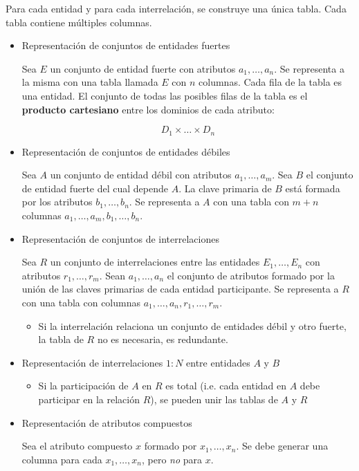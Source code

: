 \documentclass[a4paper, twoside]{article}
\begin{document}
Para cada entidad y para cada interrelación, se construye una única
tabla. Cada tabla contiene múltiples columnas.
\begin{itemize}
\item Representación de conjuntos de entidades fuertes


Sea $E$ un conjunto de entidad fuerte con atributos $a_{1},\ldots,a_{n}$.
Se representa a la misma con una tabla llamada $E$ con $n$ columnas.
Cada fila de la tabla es una entidad. El conjunto de todas las posibles
filas de la tabla es el \textbf{producto cartesiano }entre los dominios
de cada atributo:


\[
D_{1}\times\ldots\times D_{n}
\]


\item Representación de conjuntos de entidades débiles


Sea $A$ un conjunto de entidad débil con atributos $a_{1},\ldots,a_{m}$.
Sea $B$ el conjunto de entidad fuerte del cual depende $A$. La clave
primaria de $B$ está formada por los atributos $b_{1},\ldots,b_{n}$.
Se representa a $A$ con una tabla con $m+n$ columnas $a_{1},\ldots,a_{m},b_{1},\ldots,b_{n}$.

\item Representación de conjuntos de interrelaciones


Sea $R$ un conjunto de interrelaciones entre las entidades $E_{1},\dots,E_{n}$
con atributos $r_{1},\ldots,r_{m}$. Sean $a_{1},\ldots,a_{n}$ el
conjunto de atributos formado por la unión de las claves primarias
de cada entidad participante. Se representa a $R$ con una tabla con
columnas $a_{1},\ldots,a_{n},r_{1},\ldots,r_{m}$.
\begin{itemize}
\item Si la interrelación relaciona un conjunto de entidades débil y otro
fuerte, la tabla de $R$ no es necesaria, es redundante.
\end{itemize}
\item Representación de interrelaciones $1:N$ entre entidades $A$ y $B$

\begin{itemize}
\item Si la participación de $A$ en $R$ es total (i.e. cada entidad en
$A$ debe participar en la relación $R$), se pueden unir las tablas
de $A$ y $R$
\end{itemize}
\item Representación de atributos compuestos


Sea el atributo compuesto $x$ formado por $x_{1},\ldots,x_{n}$.
Se debe generar una columna para cada $x_{1},\ldots,x_{n}$, pero
\emph{no} para $x$.


\end{itemize}
\end{document}
